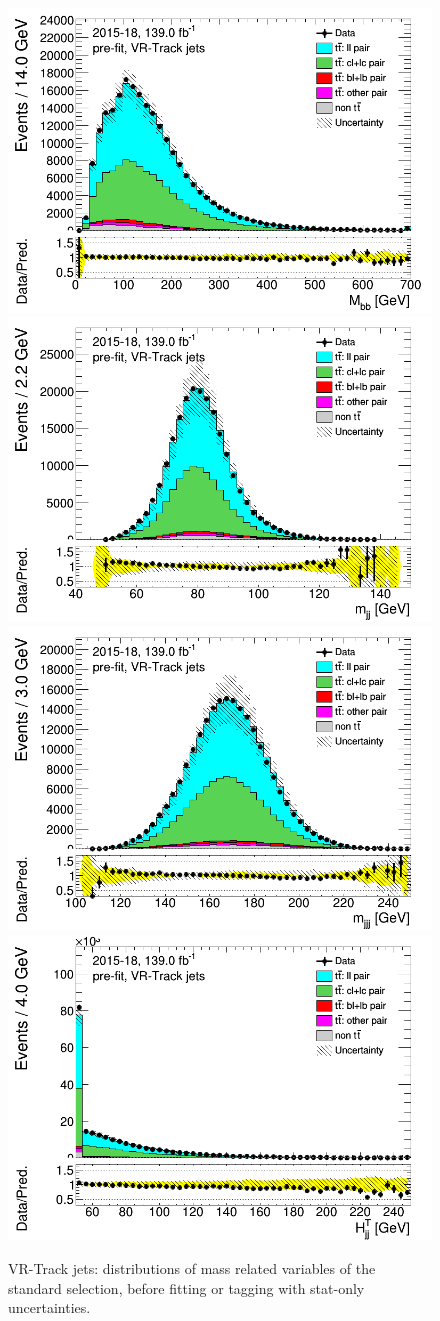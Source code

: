 \newpage
\begin{figure}[H]
\includegraphics[width=.45\textwidth]{FTAG_plots/pretagNoRwwithouthighpTVRJetsall/DataMC_h_Mbbtrackjet.png}
\includegraphics[width=.45\textwidth]{FTAG_plots/pretagNoRwwithouthighpTVRJetsall/DataMC_h_mjjtrackjet.png}\\
\includegraphics[width=.45\textwidth]{FTAG_plots/pretagNoRwwithouthighpTVRJetsall/DataMC_h_mjjjtrackjet.png}
\includegraphics[width=.45\textwidth]{FTAG_plots/pretagNoRwwithouthighpTVRJetsall/DataMC_h_Htjjtrackjet.png}\\
\caption{VR-Track jets: distributions of mass related variables of the standard selection, 
before fitting or tagging with stat-only uncertainties.} \label{fig:standard_mass_VRJets}
\end{figure}


